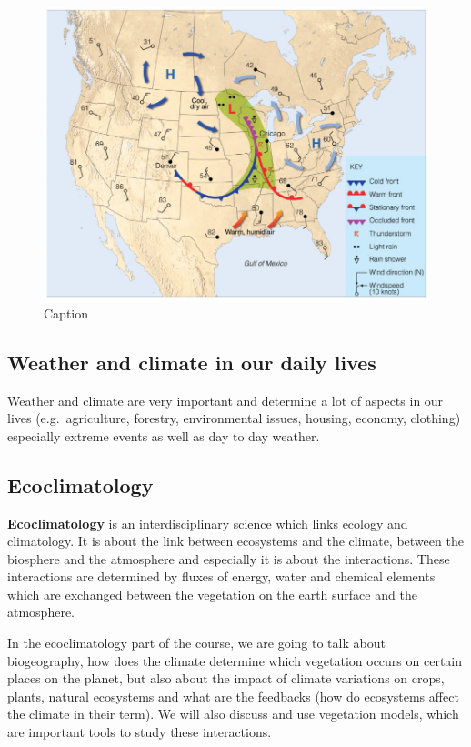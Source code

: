 \documentclass[oneside]{book}
\begin{document}
\begin{figure}

{\centering \includegraphics[width=0.5\linewidth]{figures/Figure18} 

}

\caption{Caption}\label{fig:History2}
\end{figure}

\subsection{Weather and climate in our daily
lives}\label{weather-and-climate-in-our-daily-lives}

Weather and climate are very important and determine a lot of aspects in
our lives (e.g.~agriculture, forestry, environmental issues, housing,
economy, clothing) especially extreme events as well as day to day
weather.

\subsection{Ecoclimatology}\label{ecoclimatology}

\textbf{Ecoclimatology} is an interdisciplinary science which links
ecology and climatology. It is about the link between ecosystems and the
climate, between the biosphere and the atmosphere and especially it is
about the interactions. These interactions are determined by fluxes of
energy, water and chemical elements which are exchanged between the
vegetation on the earth surface and the atmosphere.

In the ecoclimatology part of the course, we are going to talk about
biogeography, how does the climate determine which vegetation occurs on
certain places on the planet, but also about the impact of climate
variations on crops, plants, natural ecosystems and what are the
feedbacks (how do ecosystems affect the climate in their term). We will
also discuss and use vegetation models, which are important tools to
study these interactions.
\end{document}
